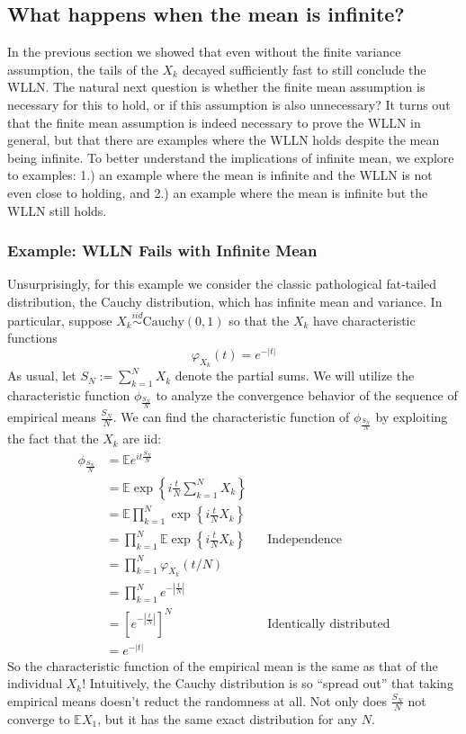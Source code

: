 \documentclass[12pt]{article}
\newcommand*{\abs}[1]{\left\lvert#1\right\rvert}
\newcommand{\E}{\mathbb{E}}
\begin{document}
\subsection{What happens when the mean is infinite?}
In the previous section we showed that even without the finite variance assumption, the tails of the $X_k$ decayed sufficiently fast to still conclude the WLLN. The natural next question is whether the finite mean assumption 
is necessary for this to hold, or if this assumption is also unnecessary? It turns out that the finite mean assumption is indeed necessary to prove the WLLN in general, but that there are examples where the WLLN holds despite 
the mean being infinite. To better understand the implications of infinite mean, we explore to examples: 1.) an example where the mean is infinite and the WLLN is not even close to holding, and 2.) an example where the mean is 
infinite but the WLLN still holds. 

\subsubsection{Example: WLLN Fails with Infinite Mean}
Unsurprisingly, for this example we consider the classic pathological fat-tailed distribution, the Cauchy distribution, which has infinite mean and variance.
 In particular, suppose $X_k \overset{iid}{\sim} \text{Cauchy}(0, 1)$ so that the $X_k$ have characteristic functions
\[\varphi_{X_k}(t) = e^{-\abs{t}}\]
As usual, let $S_N := \sum_{k = 1}^{N} X_k$ denote the partial sums. We will utilize the characteristic function $\phi_{\frac{S_N}{N}}$ to analyze the convergence behavior of the sequence of empirical means $\frac{S_N}{N}$. We can 
find the characteristic function of $\phi_{\frac{S_N}{N}}$ by exploiting the fact that the $X_k$ are iid: 
\begin{align*}
\phi_{\frac{S_N}{N}} &= \E e^{it \frac{S_N}{N}} \\
			       &= \E \exp\left\{i\frac{t}{N} \sum_{k = 1}^{N} X_k \right\} \\
			       &= \E \prod_{k = 1}^{N} \exp\left\{i \frac{t}{N} X_k \right\} \\
			       &= \prod_{k = 1}^{N} \E \exp\left\{i \frac{t}{N} X_k \right\} && \text{Independence} \\
			       &=  \prod_{k = 1}^{N} \varphi_{X_k}(t/N) \\
			       &= \prod_{k = 1}^{N} e^{-\abs{\frac{t}{N}}} \\
			       &= \left[ e^{-\abs{\frac{t}{N}}} \right]^N && \text{Identically distributed} \\
			       &= e^{-\abs{t}}
\end{align*} 
So the characteristic function of the empirical mean is the same as that of the individual $X_k$! Intuitively, the Cauchy distribution is so ``spread out'' that taking empirical means doesn't reduct the randomness at all. Not only does 
$\frac{S_N}{N}$ not converge to $\E X_1$, but it has the same exact distribution for any $N$.  
\end{document}
